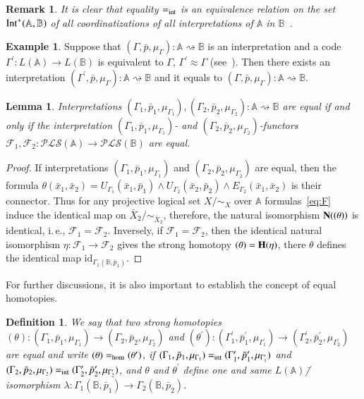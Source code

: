 \documentclass[12pt]{article}
\newtheorem{lemma}{Lemma}
\newtheorem{remark}{Remark}
\newtheorem{definition}{Definition}
\theoremstyle{definition}
\newtheorem{example}{Example}
\def\MA{{\mathbb{A}}}
\def\MB{{\mathbb{B}}}
\def\F{{\mathcal{F}}}
\def\PLS{{\mathcal{PLS}}}
\def\id{{\mathrm{id}}}
\begin{document}
\begin{remark}
It is clear that equality $=_{\rm int}$ is an equivalence relation on the set ${\rm Int}^+(\MA,\MB)$ of all coordinatizations of all interpretations of $\MA$ in $\MB$~\cite[Definition~15]{Th_int1}.
\end{remark}

\begin{example}\label{ex:approx}
Suppose that $(\Gamma,\bar p,\mu_{\Gamma})\colon \MA\rightsquigarrow\MB$ is an interpretation and a code $\Gamma^\prime\colon L(\MA)\to L(\MB)$ is equivalent to $\Gamma$, $\Gamma^\prime\approx\Gamma$ (see~\cite[Definition~3]{Th_int1}). Then there exists an interpretation $(\Gamma^\prime,\bar p,\mu_{\Gamma})\colon \MA\rightsquigarrow\MB$ and it equals to $(\Gamma,\bar p,\mu_{\Gamma})\colon \MA\rightsquigarrow\MB$.
\end{example}

\begin{lemma}\label{le:equal}
Interpretations $(\Gamma_1,\bar p_1,\mu_{\Gamma_1}),(\Gamma_2,\bar p_2,\mu_{\Gamma_2})\colon \MA\rightsquigarrow\MB$ are equal if and only if the interpretation $(\Gamma_1,\bar p_1,\mu_{\Gamma_1})$- and $(\Gamma_2,\bar p_2,\mu_{\Gamma_2})$-functors $\F_1,\F_2\colon \PLS(\MA)\to \PLS(\MB)$ are equal.
\end{lemma}

\begin{proof}
If interpretations $(\Gamma_1,\bar p_1,\mu_{\Gamma_1})$ and $(\Gamma_2,\bar p_2,\mu_{\Gamma_2})$ are equal, then the formula $\theta(\bar x_1,\bar x_2)=U_{\Gamma_1}(\bar x_1,\bar p_1)\wedge U_{\Gamma_2}(\bar x_2,\bar p_2)\wedge E_{\Gamma_2}(\bar x_1,\bar x_2)$ is their connector. Thus for any projective logical set $X/{\sim_X}$ over $\MA$ formulas~\eqref{eq:F} induce the identical map on $\bar X_2/{\sim_{\bar X_2}}$, therefore, the natural isomorphism ${\bf N}((\theta))$ is identical, i.\,e., $\F_1=\F_2$. Inversely, if $\F_1=\F_2$, then the identical natural isomorphism $\eta\colon \F_1\to\F_2$ gives the strong homotopy $(\theta)={\bf H}(\eta)$, there $\theta$ defines the identical map $\id_{\Gamma_1(\MB,\bar p_1)}$. 
\end{proof}

For further discussions, it is also important to establish the concept of equal homotopies. 

\begin{definition}
We say that two strong homotopies $(\theta)\colon (\Gamma_1,\bar p_1,\mu_{\Gamma_1})\to (\Gamma_2,\bar p_2,\mu_{\Gamma_2})$ and $(\theta^\prime)\colon (\Gamma^\prime_1,\bar p^\prime_1,\mu_{\Gamma^\prime_1})\to (\Gamma^\prime_2,\bar p^\prime_2,\mu_{\Gamma^\prime_2})$ are equal and write $(\theta)=_{\rm hom}(\theta^\prime)$, if $(\Gamma_1,\bar p_1,\mu_{\Gamma_1})=_{\rm int}(\Gamma^\prime_1,\bar p^\prime_1,\mu_{\Gamma^\prime_1})$ and $(\Gamma_2,\bar p_2,\mu_{\Gamma_2})=_{\rm int}(\Gamma^\prime_2,\bar p^\prime_2,\mu_{\Gamma^\prime_2})$, and $\theta$ and $\theta^\prime$ define one and same $L(\MA)$\=/isomorphism $\lambda\colon \Gamma_1(\MB,\bar p_1)\to\Gamma_2(\MB,\bar p_2)$.
\end{definition}
\end{document}

